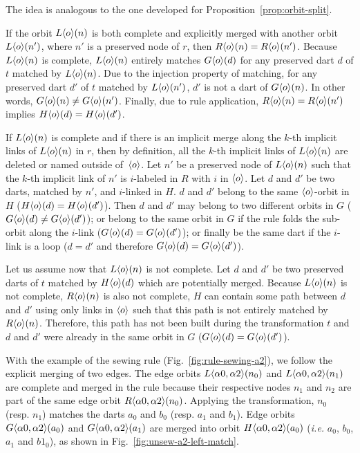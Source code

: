 \begin{proofidea}
  The idea is analogous to the one developed for Proposition~\ref{prop:orbit-split}.

  If the orbit $L\langle o\rangle(n)$ is both complete and explicitly merged with another orbit $L\langle o\rangle(n')$, where $n'$ is a preserved node of $r$, then $R\langle o\rangle(n) = R\langle o\rangle(n')$.
  Because $L\langle o\rangle(n)$ is complete, $L\langle o\rangle(n)$ entirely matches $G\langle o\rangle(d)$ for any preserved dart $d$ of $t$ matched by $L\langle o\rangle(n)$.
  Due to the injection property of matching, for any preserved dart $d'$ of $t$ matched by $L\langle o\rangle(n')$, $d'$ is not a dart of $G\langle o\rangle(n)$.
  In other words, $G\langle o\rangle(n) \neq G\langle o\rangle(n')$.
  Finally, due to rule application,  $R\langle o\rangle(n) = R\langle o\rangle(n')$ implies $H\langle o\rangle(d) = H\langle o\rangle(d')$.

  If $L\langle o\rangle(n)$ is complete and if there is an implicit merge along the $k$-th implicit links of $L\langle o\rangle(n)$ in $r$, then by definition, all the $k$-th implicit links of $L\langle o\rangle(n)$ are deleted or named outside of~$\langle o\rangle$.
  Let $n'$ be a preserved node of $L\langle o\rangle(n)$ such that the $k$-th implicit link of $n'$ is $i$-labeled in $R$ with $i$ in $\langle o\rangle$.
  Let $d$ and $d'$ be two darts, matched by $n'$, and $i$-linked in $H$.
  $d$ and $d'$ belong to the same $\langle o\rangle$-orbit in $H$ ($H\langle o\rangle(d) = H\langle o\rangle(d')$).
  Then $d$ and $d'$ may belong to two different orbits in $G$ ($G\langle o\rangle(d) \neq G\langle o\rangle(d')$); or belong to the same orbit in $G$ if the rule folds the sub-orbit along the $i$-link ($G\langle o\rangle(d) = G\langle o\rangle(d')$); or finally be the same dart if the $i$-link is a loop ($d = d'$ and therefore  $G\langle o\rangle(d) = G\langle o\rangle(d')$).

  Let us assume now that $L\langle o\rangle(n)$ is not complete. Let $d$ and $d'$ be two preserved darts of $t$ matched by $H\langle o\rangle(d)$ which are potentially merged.
  Because $L\langle o\rangle(n)$ is not complete, $R\langle o\rangle(n)$ is also not complete, $H$ can contain some path between $d$ and $d'$ using only links in $\langle o\rangle$ such that this path is not entirely matched by $R\langle o\rangle(n)$.
  Therefore, this path has not been built during the transformation $t$ and $d$ and $d'$ were already in the same orbit in $G$ ($G\langle o\rangle(d) = G\langle o\rangle(d')$).
\end{proofidea}

With the example of the sewing rule (Fig.~\ref{fig:rule-sewing-a2}), we follow the explicit merging of two edges.
The edge orbits $L\langle\alpha 0, \alpha 2\rangle(n_{0})$ and $L\langle\alpha 0, \alpha 2\rangle(n_{1})$ are complete and merged in the rule because their respective nodes $n_{1}$ and $n_{2}$ are part of the same edge orbit $R\langle\alpha 0, \alpha 2\rangle(n_{0})$.
Applying the transformation, $n_{0}$ (resp. $n_{1}$) matches the darts $a_{0}$ and $b_{0}$ (resp. $a_{1}$ and $b_{1}$).
Edge orbits $G\langle\alpha 0, \alpha 2\rangle(a_{0})$ and $G\langle\alpha 0, \alpha 2\rangle(a_{1})$ are merged into orbit $H\langle\alpha 0, \alpha 2\rangle(a_{0})$ (\textit{i.e.} $a_{0}$, $b_{0}$, $a_{1}$ and $b1_{0}$), as shown in Fig.~\ref{fig:unsew-a2-left-match}.

